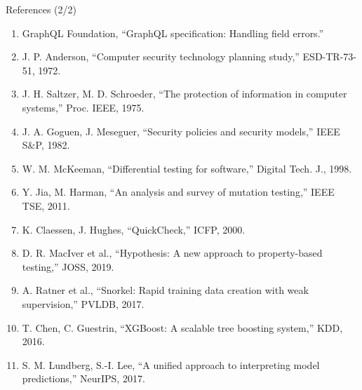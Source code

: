\documentclass[aspectratio=169,11pt]{beamer}
\begin{document}
\begin{frame}{References (2/2)}
\scriptsize
\begin{enumerate}\setlength{\itemsep}{1pt}\setcounter{enumi}{12}
\item[{[13]}] GraphQL Foundation, “GraphQL specification: Handling field errors.”
\item[{[14]}] J. P. Anderson, “Computer security technology planning study,” ESD-TR-73-51, 1972.
\item[{[15]}] J. H. Saltzer, M. D. Schroeder, “The protection of information in computer systems,” Proc. IEEE, 1975.
\item[{[16]}] J. A. Goguen, J. Meseguer, “Security policies and security models,” IEEE S\&P, 1982.
\item[{[17]}] W. M. McKeeman, “Differential testing for software,” Digital Tech. J., 1998.
\item[{[18]}] Y. Jia, M. Harman, “An analysis and survey of mutation testing,” IEEE TSE, 2011.
\item[{[19]}] K. Claessen, J. Hughes, “QuickCheck,” ICFP, 2000.
\item[{[20]}] D. R. MacIver et al., “Hypothesis: A new approach to property-based testing,” JOSS, 2019.
\item[{[21]}] A. Ratner et al., “Snorkel: Rapid training data creation with weak supervision,” PVLDB, 2017.
\item[{[22]}] T. Chen, C. Guestrin, “XGBoost: A scalable tree boosting system,” KDD, 2016.
\item[{[23]}] S. M. Lundberg, S.-I. Lee, “A unified approach to interpreting model predictions,” NeurIPS, 2017.
\end{enumerate}
\end{frame}
\end{document}
